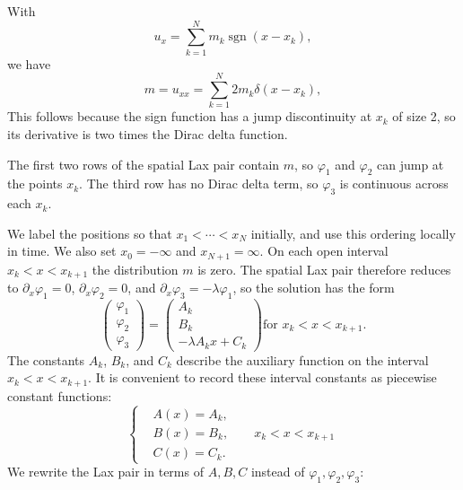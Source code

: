 \documentclass[english,master]{liumaiex}
\theoremstyle{thesisplain}
\theoremstyle{thesisdefinition}
\DeclareMathOperator{\sgn}{sgn}
\numberwithin{equation}{section}
\begin{document}
With
\begin{equation}
	u_x = \sum_{k=1}^N m_k \sgn(x - x_k),
\end{equation}
we have
\begin{equation}
	m = u_{xx} = \sum_{k=1}^N 2 m_k \delta(x - x_k),
\end{equation}
This follows because the sign function has a jump discontinuity at $x_k$ of size 2, so its derivative is two times the Dirac delta function.

The first two rows of the spatial Lax pair contain $m$, so $\varphi_1$ and $\varphi_2$ can jump at the points $x_k$. The third row has no Dirac delta term, so $\varphi_3$ is continuous across each $x_k$.

We label the positions so that $x_1 < \cdots < x_N$ initially, and use this ordering locally in time. We also set $x_0=-\infty$ and $x_{N+1}=\infty$. On each open interval $x_k<x<x_{k+1}$ the distribution $m$ is zero. The spatial Lax pair therefore reduces to $\partial_x \varphi_1=0$, $\partial_x \varphi_2=0$, and $\partial_x \varphi_3=-\lambda\varphi_1$, so the solution has the form
\begin{equation}
\begin{pmatrix} \varphi_1 \\ \varphi_2 \\ \varphi_3 \end{pmatrix} =
\begin{pmatrix} A_k \\ B_k \\ -\lambda A_k x + C_k \end{pmatrix} 
\text{for } x_k < x < x_{k+1}.
\end{equation}
The constants $A_k$, $B_k$, and $C_k$ describe the auxiliary function on the interval $x_k < x < x_{k+1}$. It is convenient to record these interval constants as piecewise constant functions:
\begin{equation}
\left\{ \begin{aligned}
	&A(x) = A_k, \\
	&B(x) = B_k, \qquad x_k < x < x_{k+1} \\
	&C(x) = C_k.
\end{aligned} \right.
\end{equation}
%
We rewrite the Lax pair in terms of $A, B, C$ instead of $\varphi_1, \varphi_2, \varphi_3$:
\end{document}
